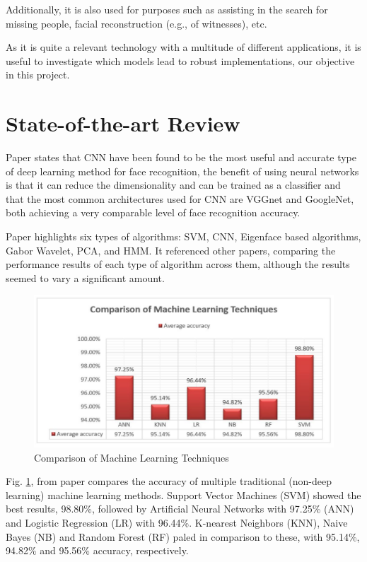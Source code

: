 \documentclass[conference]{IEEEtran}
\begin{document}
Additionally, it is also used for purposes such as assisting in the search for missing people, facial reconstruction (e.g., of witnesses), etc.

As it is quite a relevant technology with a multitude of different applications, it is useful to investigate which models lead to robust implementations, our objective in this project.

\section{State-of-the-art Review}

Paper\cite{clarifai_paper} states that CNN have been found to be the most useful and accurate type of deep learning method for face recognition, the benefit of using neural networks is that it can reduce the dimensionality and can be trained as a classifier and that the most common architectures used for CNN are VGGnet and GoogleNet, both achieving a very comparable level of face recognition accuracy.

Paper\cite{modi_patel_paper} highlights six types of algorithms: SVM, CNN, Eigenface based algorithms, Gabor Wavelet, PCA, and HMM. It referenced other papers, comparing the performance results of each type of algorithm across them, although the results seemed to vary a significant amount.

\begin{figure}[]
    \centering
    \includegraphics[scale=0.45]{images/12_hal_comparison.png}
    \caption{Comparison of Machine Learning Techniques\cite{hal_paper}}
    \label{fig:hal_comparison}
\end{figure}

Fig. \ref{fig:hal_comparison}, from paper\cite{hal_paper} compares the accuracy of multiple traditional (non-deep learning) machine learning methods. Support Vector Machines (SVM) showed the best results, 98.80\%, followed by Artificial Neural Networks with 97.25\% (ANN) and Logistic Regression (LR) with 96.44\%. K-nearest Neighbors (KNN), Naive Bayes (NB) and Random Forest (RF) paled in comparison to these, with 95.14\%, 94.82\% and 95.56\% accuracy, respectively.
\end{document}
